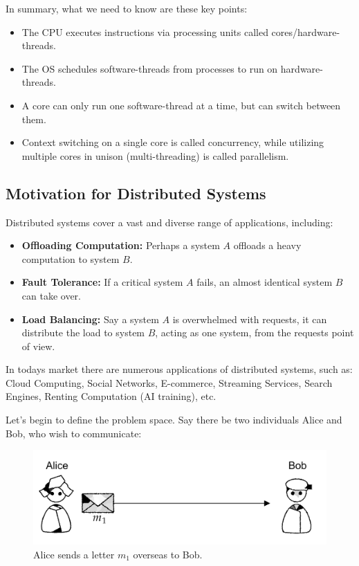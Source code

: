 \noindent
In summary, what we need to know are these key points:
\begin{itemize}
    \item The CPU executes instructions via processing units called cores/hardware-threads.
    \item The OS schedules software-threads from processes to run on hardware-threads.
    \item A core can only run one software-thread at a time, but can switch between them.
    \item Context switching on a single core is called concurrency, while utilizing multiple cores in unison (multi-threading) is called parallelism.
\end{itemize}


\newpage 

\noindent
\subsection{Motivation for Distributed Systems}

\noindent
Distributed systems cover a vast and diverse range of applications, including:
\begin{itemize}
    \item \textbf{Offloading Computation:} Perhaps a system $A$ offloads a heavy computation to system $B$.
    \item \textbf{Fault Tolerance:} If a critical system $A$ fails, an almost identical system $B$ can take over.
    \item \textbf{Load Balancing:} Say a system $A$ is overwhelmed with requests, it can distribute the load to system $B$, acting as 
    one system, from the requests point of view.
\end{itemize}
In todays market there are numerous applications of distributed systems, such as:
Cloud Computing, Social Networks, E-commerce, Streaming Services, Search Engines, Renting Computation (AI training), etc.

Let's begin to define the problem space. Say there be 
two individuals Alice and Bob, who wish to communicate:\\
\begin{figure}[h]
    \centering
    \includegraphics[width=.8\textwidth]{./Sections/high/com.png}
    \caption{Alice sends a letter $m_1$ overseas to Bob.}
\end{figure}

